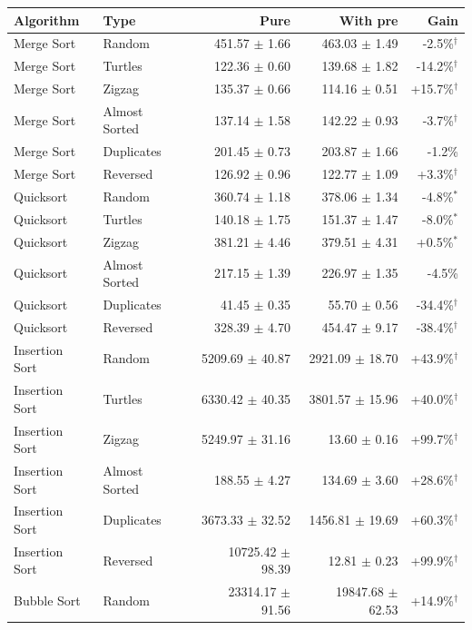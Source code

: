 \begin{tabular*}{\textwidth}{@{\extracolsep\fill}llrrr@{\extracolsep\fill}}
\toprule
Algorithm & Type & Pure & With pre & Gain\\
\midrule
Merge Sort & Random & 451.57 $\pm$ 1.66 & 463.03 $\pm$ 1.49 & -2.5\%$^{\dagger}$ \\
Merge Sort & Turtles & 122.36 $\pm$ 0.60 & 139.68 $\pm$ 1.82 & -14.2\%$^{\dagger}$ \\
Merge Sort & Zigzag & 135.37 $\pm$ 0.66 & 114.16 $\pm$ 0.51 & +15.7\%$^{\dagger}$ \\
Merge Sort & Almost Sorted & 137.14 $\pm$ 1.58 & 142.22 $\pm$ 0.93 & -3.7\%$^{\dagger}$ \\
Merge Sort & Duplicates & 201.45 $\pm$ 0.73 & 203.87 $\pm$ 1.66 & -1.2\% \\
Merge Sort & Reversed & 126.92 $\pm$ 0.96 & 122.77 $\pm$ 1.09 & +3.3\%$^{\dagger}$ \\
Quicksort & Random & 360.74 $\pm$ 1.18 & 378.06 $\pm$ 1.34 & -4.8\%$^{*}$ \\
Quicksort & Turtles & 140.18 $\pm$ 1.75 & 151.37 $\pm$ 1.47 & -8.0\%$^{*}$ \\
Quicksort & Zigzag & 381.21 $\pm$ 4.46 & 379.51 $\pm$ 4.31 & +0.5\%$^{*}$ \\
Quicksort & Almost Sorted & 217.15 $\pm$ 1.39 & 226.97 $\pm$ 1.35 & -4.5\% \\
Quicksort & Duplicates & 41.45 $\pm$ 0.35 & 55.70 $\pm$ 0.56 & -34.4\%$^{\dagger}$ \\
Quicksort & Reversed & 328.39 $\pm$ 4.70 & 454.47 $\pm$ 9.17 & -38.4\%$^{\dagger}$ \\
Insertion Sort & Random & 5209.69 $\pm$ 40.87 & 2921.09 $\pm$ 18.70 & +43.9\%$^{\dagger}$ \\
Insertion Sort & Turtles & 6330.42 $\pm$ 40.35 & 3801.57 $\pm$ 15.96 & +40.0\%$^{\dagger}$ \\
Insertion Sort & Zigzag & 5249.97 $\pm$ 31.16 & 13.60 $\pm$ 0.16 & +99.7\%$^{\dagger}$ \\
Insertion Sort & Almost Sorted & 188.55 $\pm$ 4.27 & 134.69 $\pm$ 3.60 & +28.6\%$^{\dagger}$ \\
Insertion Sort & Duplicates & 3673.33 $\pm$ 32.52 & 1456.81 $\pm$ 19.69 & +60.3\%$^{\dagger}$ \\
Insertion Sort & Reversed & 10725.42 $\pm$ 98.39 & 12.81 $\pm$ 0.23 & +99.9\%$^{\dagger}$ \\
Bubble Sort & Random & 23314.17 $\pm$ 91.56 & 19847.68 $\pm$ 62.53 & +14.9\%$^{\dagger}$ \\

\end{tabular*}
